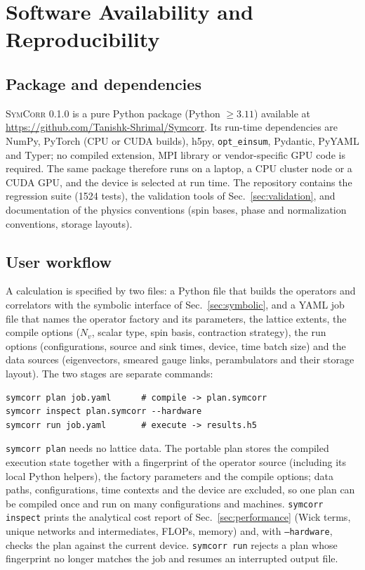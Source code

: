\documentclass[a4paper,fleqn]{cas-dc}
\begin{document}

\section{Software Availability and Reproducibility}
\label{sec:software}

\subsection{Package and dependencies}

\textsc{SymCorr} 0.1.0 is a pure Python package (Python \(\ge 3.11\)) available at
\url{https://github.com/Tanishk-Shrimal/Symcorr}.
Its run-time dependencies are NumPy, PyTorch (CPU or CUDA builds), h5py,
\texttt{opt\_einsum}, Pydantic, PyYAML and Typer; no compiled extension, MPI
library or vendor-specific GPU code is required. The same package therefore runs on a
laptop, a CPU cluster node or a CUDA GPU, and the device is selected at run time.
The repository contains the regression suite (1524 tests), the validation tools
of Sec.~\ref{sec:validation}, and documentation of the physics conventions
(spin bases, phase and normalization conventions, storage layouts).

\subsection{User workflow}

A calculation is specified by two files: a Python file that builds the operators
and correlators with the symbolic interface of Sec.~\ref{sec:symbolic}, and a
YAML job file that names the operator factory and its parameters, the lattice
extents, the compile options (\(N_v\), scalar type, spin basis, contraction
strategy), the run options (configurations, source and sink times, device, time
batch size) and the data sources (eigenvectors, smeared gauge links,
perambulators and their storage layout). The two stages are separate commands:
{\footnotesize
\begin{verbatim}
symcorr plan job.yaml      # compile -> plan.symcorr
symcorr inspect plan.symcorr --hardware
symcorr run job.yaml       # execute -> results.h5
\end{verbatim}
}
\texttt{symcorr plan} needs no lattice data. The portable plan stores the
compiled execution state together with a fingerprint of the operator source
(including its local Python helpers), the factory parameters and the compile
options; data paths, configurations, time contexts and the device are excluded,
so one plan can be compiled once and run on many configurations and machines.
\texttt{symcorr inspect} prints the analytical cost report of
Sec.~\ref{sec:performance} (Wick terms, unique networks and intermediates, FLOPs,
memory) and, with \texttt{--hardware}, checks the plan against the current device.
\texttt{symcorr run} rejects a plan whose fingerprint no longer matches the job and
resumes an interrupted output file.
\end{document}
